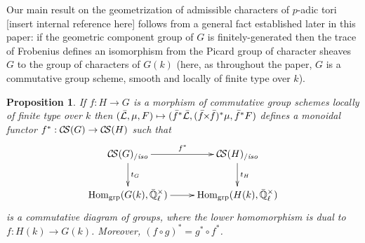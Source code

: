 \documentclass[11pt]{amsart}
\theoremstyle{plain}
\newtheorem{proposition}[theorem]{Proposition}
\theoremstyle{definition}
\theoremstyle{remark}
\newcommand{\EE}{\mathbb{\bar Q}_\ell}
\newcommand{\Fq}{k}
\DeclareMathOperator{\Hom}{Hom}
\newcommand{\gcs}[1]{{\mathcal{\bar #1}}}
\newcommand{\CS}{{\mathcal{C\hskip-1.8pt S}}}
\newcommand{\CSiso}[1]{\CS(#1)_{/\textit{iso}}}
\newcommand{\tightertimes}{\hskip-3pt\times\hskip-3pt}
\begin{document}
Our main result on the geometrization of admissible characters of
$p$-adic tori [insert internal reference here] follows from a general
fact established later in this paper: if the geometric component group
of $G$ is finitely-generated then the trace of Frobenius defines an
isomorphism from the Picard group of character sheaves $G$ to the
group of characters of $G(\Fq)$ (here, as throughout the paper, $G$ is
a commutative group scheme, smooth and locally of finite type over $\Fq$).


\begin{proposition}\label{prop:pullback}
  If $f : H\to G$ is a morphism of commutative group schemes locally of finite type over $\Fq$ then
  $(\gcs{L},\mu,F) \mapsto ({\bar f}^*\gcs{L},({\bar f}\tightertimes{\bar f})^*\mu,{\bar f}^*F)$
  defines a monoidal functor $f^* : \CS(G) \to \CS(H)$ such that
  \[
  \xymatrix{
  \CSiso{G} \ar[r]^{f^*} \ar[d]^{t_{G}} &  \ar[d]^{t_{H}} \CSiso{H}\\
  \Hom_\text{grp}(G(\Fq),\EE^\times) \ar[r] & \Hom_\text{grp}(H(\Fq),\EE^\times)
  }
  \]
  is a commutative diagram of groups, where the lower homomorphism is
  dual to $f : H(\Fq)\to G(\Fq)$.  Moreover, $(f\circ g)^* = g^* \circ f^*$.
\end{proposition}
\end{document}
